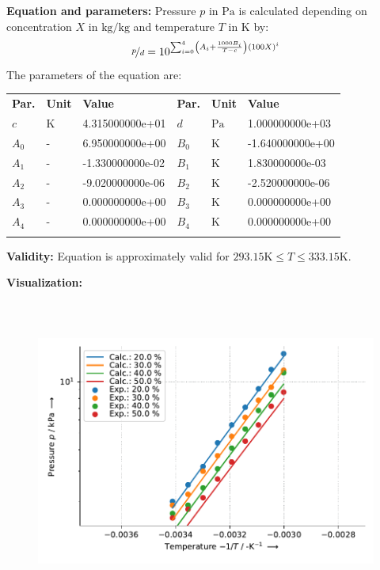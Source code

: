 \textbf{Equation and parameters:}
\newline
%
Pressure $p$ in $\si{\pascal}$ is calculated depending on concentration $X$ in $\si{\kilogram\per\kilogram}$ and  temperature $T$ in $\si{\kelvin}$ by:
%
\begin{equation*}
\nicefrac{p}{d} = 10 ^ { \sum_{i=0}^{4} \left( A_i + \frac{1000 B_i}{T - c} \right) \left( 100 X \right) ^{i}}
\end{equation*}
%
The parameters of the equation are:
%
\begin{longtable}[l]{lll|lll}
\toprule
\addlinespace
\textbf{Par.} & \textbf{Unit} & \textbf{Value} &	\textbf{Par.} & \textbf{Unit} & \textbf{Value} \\
\addlinespace
\midrule
\endhead

\bottomrule
\endfoot
\bottomrule
\endlastfoot
\addlinespace

$c$ & $\si{\kelvin}$ & 4.315000000e+01 & $d$ & $\si{\pascal}$ & 1.000000000e+03 \\
$A_0$ & - & 6.950000000e+00 & $B_0$ & $\si{\kelvin}$ & -1.640000000e+00 \\
$A_1$ & - & -1.330000000e-02 & $B_1$ & $\si{\kelvin}$ & 1.830000000e-03 \\
$A_2$ & - & -9.020000000e-06 & $B_2$ & $\si{\kelvin}$ & -2.520000000e-06 \\
$A_3$ & - & 0.000000000e+00 & $B_3$ & $\si{\kelvin}$ & 0.000000000e+00 \\
$A_4$ & - & 0.000000000e+00 & $B_4$ & $\si{\kelvin}$ & 0.000000000e+00 \\

\addlinespace\end{longtable}

\textbf{Validity:}
\newline
Equation is approximately valid for $293.15 \si{\kelvin} \leq T \leq 333.15 \si{\kelvin}$.
\newline

\textbf{Visualization:}
%
\begin{figure}[!htp]
{\noindent\includegraphics[height=10cm, keepaspectratio]{figs/abs/abs_Water_LiBr_CH3COOK_ratio_2_1_Antoine_1.pdf}}
\end{figure}
%

